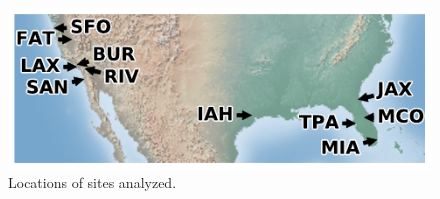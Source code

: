\documentclass[10pt,a4paper,twocolumn]{article}
\begin{document}
% 
% 

\begin{figure}[ht!]
\centering
\includegraphics{figs/sitemap.pdf}
\caption{\label{fig:sitemap}Locations of sites analyzed.}
\end{figure}
\end{document}
